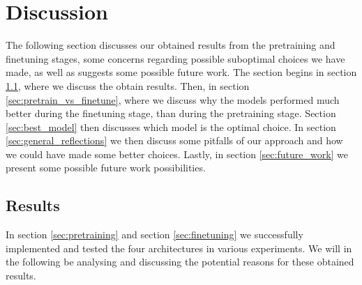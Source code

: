 \documentclass[./main.tex]{subfiles}
\begin{document}
\section{Discussion}
\label{sec:discussion}
The following section discusses our obtained results from the pretraining and finetuning stages, some concerns regarding possible suboptimal choices we have made, as well as suggests some possible future work. The section begins in section \ref{sec:results}, where we discuss the obtain results. Then, in section \ref{sec:pretrain_vs_finetune}, where we discuss why the models performed much better during the finetuning stage, than during the pretraining stage. Section \ref{sec:best_model} then discusses which model is the optimal choice. In section \ref{sec:general_reflections} we then discuss some pitfalls of our approach and how we could have made some better choices. Lastly, in section \ref{sec:future_work} we present some possible future work possibilities.

\subsection{Results}
\label{sec:results}
In section \ref{sec:pretraining} and section \ref{sec:finetuning} we successfully implemented and tested the four architectures in various experiments. We will in the following be analysing and discussing the potential reasons for these obtained results.
\end{document}
